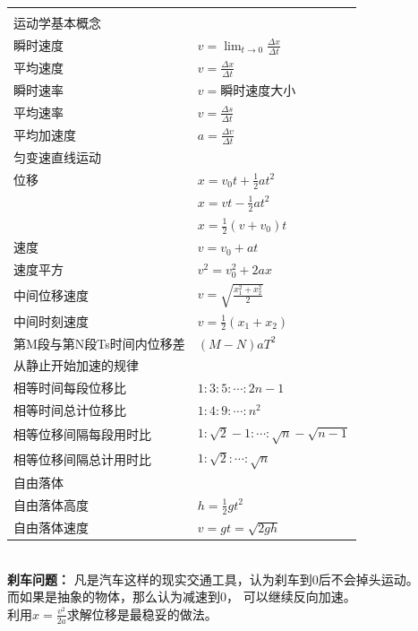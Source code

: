 \documentclass[a4paper, landscape, 10pt, twocolumn]{article}
\begin{document}
\renewcommand{\arraystretch}{1.5}
\noindent
\begin{tabularx}{\columnwidth}{XX}
  \rowcolor{blue!30}
  \multicolumn{2}{l}{\parbox[c][2.5\ht\strutbox][c]{0.9\columnwidth}{\Large 运动学}} \\
  \multicolumn{2}{l}{\textsf{运动学基本概念}}\\
  瞬时速度&$v=\lim_{t\to0} \frac{\Delta x}{\Delta t}$\\
  平均速度&$v=\frac{\Delta x}{\Delta t}$\\
  瞬时速率&$v=$瞬时速度大小\\
  平均速率&$v=\frac{\Delta s}{\Delta t}$\\
  平均加速度&$a=\frac{\Delta v}{\Delta t}$\\
  \multicolumn{2}{l}{\textsf{匀变速直线运动}}\\
  位移&$x=v_0t+\frac{1}{2}at^2$\\
  &$x=vt-\frac{1}{2}at^2$\\
  &$x=\frac12(v+v_0)t$\\
  速度&$v=v_0+at$\\
  速度平方&$v^2=v_0^2+2ax$\\
  中间位移速度&$v=\sqrt{\frac{x_1^2+x_2^2}2}$\\
  中间时刻速度&$v=\frac12(x_1+x_2)$\\
  第M段与第N段Ts时间内位移差&$(M-N)aT^2$\\
  \multicolumn{2}{l}{\textsf{从静止开始加速的规律}}\\
  相等时间每段位移比&$1:3:5:\cdots:2n-1$\\
  相等时间总计位移比&$1:4:9:\cdots:n^2$\\
  相等位移间隔每段用时比&$1:\sqrt2-1:\cdots:\sqrt n-\sqrt{n-1}$\\
  相等位移间隔总计用时比&$1:\sqrt2:\cdots:\sqrt n$\\
  \multicolumn{2}{l}{\textsf{自由落体}}\\
  自由落体高度&$h=\frac12gt^2$\\
  自由落体速度&$v=gt=\sqrt{2gh}$\\
\end{tabularx}
\newpage
{}\\
\textbf{刹车问题：}
凡是汽车这样的现实交通工具，认为刹车到0后不会掉头运动。\\而如果是抽象的物体，那么认为减速到0，
可以继续反向加速。\\利用$x=\frac{v^2}{2a}$求解位移是最稳妥的做法。\\
\end{document}
